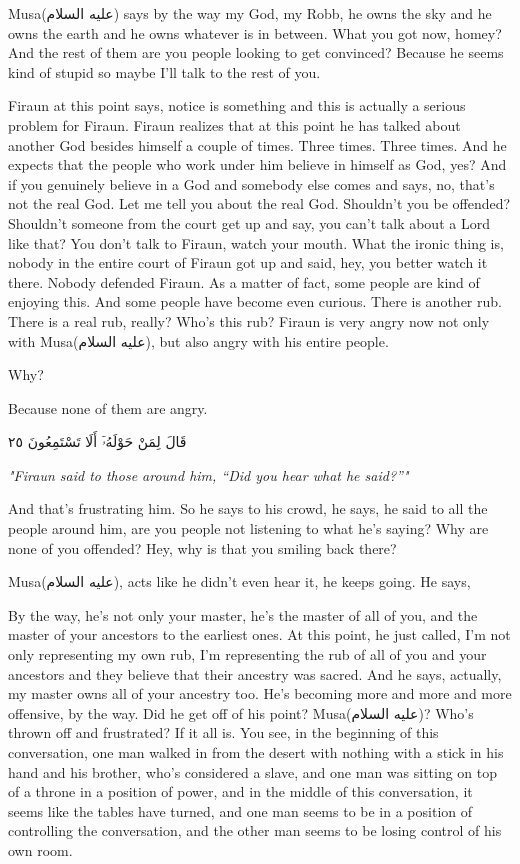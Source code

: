 \documentclass[12pt]{article}
\newcommand{\as}{\textarabic{(عليه السلام)}}
\begin{document}
Musa\as{} says by the way my God, my Robb, he owns the sky and he owns the earth and he owns whatever is in between. What you got now, homey? And the rest of them are you people looking to get convinced? Because he seems kind of stupid so maybe I'll talk to the rest of you. 

Firaun at this point says, notice is something and this is actually a serious problem for Firaun. Firaun realizes that at this point he has talked about another God besides himself a couple of times. Three times. Three times. And he expects that the people who work under him believe in himself as God, yes? And if you genuinely believe in a God and somebody else comes and says, no, that's not the real God. Let me tell you about the real God. Shouldn't you be offended? Shouldn't someone from the court get up and say, you can't talk about a Lord like that? You don't talk to Firaun, watch your mouth. What the ironic thing is, nobody in the entire court of Firaun got up and said, hey, you better watch it there. Nobody defended Firaun. As a matter of fact, some people are kind of enjoying this. And some people have become even curious. There is another rub. There is a real rub, really? Who's this rub? Firaun is very angry now not only with Musa\as{}, but also angry with his entire people. 

Why? 

Because none of them are angry. 

\textarabic{قَالَ لِمَنْ حَوْلَهُۥٓ أَلَا تَسْتَمِعُونَ ٢٥}

\textit{"Firaun said to those around him, “Did you hear what he said?”"}

And that's frustrating him. So he says to his crowd, he says, he said to all the people around him, are you people not listening to what he's saying? Why are none of you offended? Hey, why is that you smiling back there? 

Musa\as{}, acts like he didn't even hear it, he keeps going. He says, 

By the way, he's not only your master, he's the master of all of you, and the master of your ancestors to the earliest ones. At this point, he just called, I'm not only representing my own rub, I'm representing the rub of all of you and your ancestors and they believe that their ancestry was sacred. And he says, actually, my master owns all of your ancestry too. He's becoming more and more and more offensive, by the way. Did he get off of his point? Musa\as{}? Who's thrown off and frustrated? If it all is. You see, in the beginning of this conversation, one man walked in from the desert with nothing with a stick in his hand and his brother, who's considered a slave, and one man was sitting on top of a throne in a position of power, and in the middle of this conversation, it seems like the tables have turned, and one man seems to be in a position of controlling the conversation, and the other man seems to be losing control of his own room. 
\end{document}

